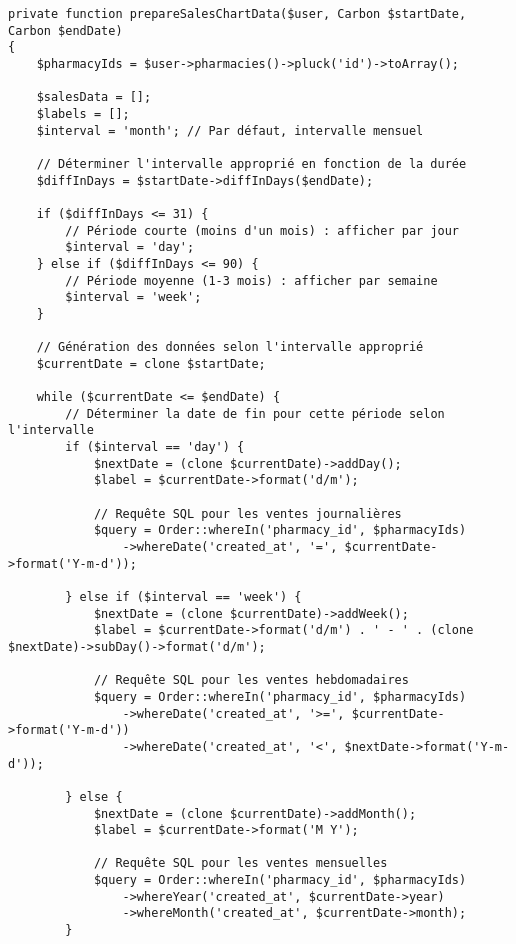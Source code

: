 \documentclass[12pt,a4paper]{article}
\begin{document}
\begin{lstlisting}[caption=Méthode prepareSalesChartData]
private function prepareSalesChartData($user, Carbon $startDate, Carbon $endDate)
{
    $pharmacyIds = $user->pharmacies()->pluck('id')->toArray();
    
    $salesData = [];
    $labels = [];
    $interval = 'month'; // Par défaut, intervalle mensuel
    
    // Déterminer l'intervalle approprié en fonction de la durée
    $diffInDays = $startDate->diffInDays($endDate);
    
    if ($diffInDays <= 31) {
        // Période courte (moins d'un mois) : afficher par jour
        $interval = 'day';
    } else if ($diffInDays <= 90) {
        // Période moyenne (1-3 mois) : afficher par semaine
        $interval = 'week';
    }
    
    // Génération des données selon l'intervalle approprié
    $currentDate = clone $startDate;
    
    while ($currentDate <= $endDate) {
        // Déterminer la date de fin pour cette période selon l'intervalle
        if ($interval == 'day') {
            $nextDate = (clone $currentDate)->addDay();
            $label = $currentDate->format('d/m');
            
            // Requête SQL pour les ventes journalières
            $query = Order::whereIn('pharmacy_id', $pharmacyIds)
                ->whereDate('created_at', '=', $currentDate->format('Y-m-d'));
                
        } else if ($interval == 'week') {
            $nextDate = (clone $currentDate)->addWeek();
            $label = $currentDate->format('d/m') . ' - ' . (clone $nextDate)->subDay()->format('d/m');
            
            // Requête SQL pour les ventes hebdomadaires
            $query = Order::whereIn('pharmacy_id', $pharmacyIds)
                ->whereDate('created_at', '>=', $currentDate->format('Y-m-d'))
                ->whereDate('created_at', '<', $nextDate->format('Y-m-d'));
                
        } else {
            $nextDate = (clone $currentDate)->addMonth();
            $label = $currentDate->format('M Y');
            
            // Requête SQL pour les ventes mensuelles
            $query = Order::whereIn('pharmacy_id', $pharmacyIds)
                ->whereYear('created_at', $currentDate->year)
                ->whereMonth('created_at', $currentDate->month);
        }
        

\end{lstlisting}
\end{document}

